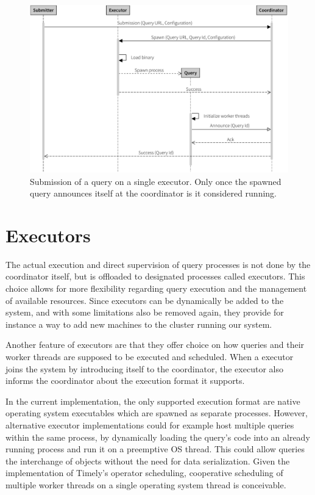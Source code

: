 \begin{figure}[htb]
  \centering
    \includegraphics[width=1\textwidth]{figures/spawn_singleprocess}
  \caption[Query submission with single process.]{Submission of a query on a single executor.
  Only once the spawned query announces itself at the coordinator is it considered running.}
  \label{fig:subsingle}
\end{figure}

\section{Executors}

The actual execution and direct supervision of query processes is not done by the
coordinator itself, but is offloaded to designated processes called executors.
This choice allows for more flexibility regarding query execution and the
management of available resources. Since executors can be dynamically be added
to the system, and with some limitations also be removed again, they provide
for instance a way to add new machines to the cluster running our system.

Another feature of executors are that they offer choice on how queries and their
worker threads are supposed to be executed and scheduled. When a executor joins
the system by introducing itself to the coordinator, the executor also informs
the coordinator about the execution format it supports.

In the current implementation, the only supported execution format are native
operating system executables which are spawned as separate processes. However,
alternative executor implementations could for example host multiple queries
within the same process, by dynamically loading the query's code into an already
running process and run it on a preemptive OS thread. This could allow queries
the interchange of objects without the need for data serialization. Given
the implementation of Timely's operator scheduling, cooperative scheduling
of multiple worker threads on a single operating system thread is conceivable.


